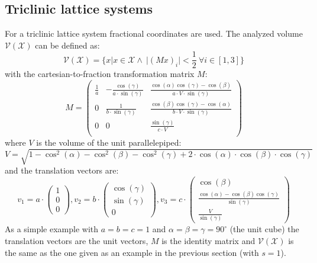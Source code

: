   \subsection{Triclinic lattice systems}
  For a triclinic lattice system fractional coordinates are used. The analyzed volume $\mathcal{V}(\mathcal{X})$ can be defined as:
  \[\mathcal{V}(\mathcal{X}) = \{x | x \in \mathcal{X} \land\ |(Mx)_i| < \frac{1}{2} ~\forall i \in [1,3]\}\]
  with the cartesian-to-fraction transformation matrix $M$:
  \[M = \begin{pmatrix}
  \frac{1}{a}&-\frac{\cos(\gamma)}{a \cdot \sin(\gamma)}&\frac{\cos(\alpha)\cos(\gamma)-\cos(\beta)}{a\cdot V \cdot \sin(\gamma)}\\
  0&\frac{1}{b \cdot \sin(\gamma)}&\frac{\cos(\beta)\cos(\gamma)-\cos(\alpha)}{b\cdot V \cdot \sin(\gamma)}\\
  0&0&\frac{\sin(\gamma)}{c \cdot V}\\
  \end{pmatrix}\]
  where $V$ is the volume of the unit parallelepiped:
  \[V = \sqrt{1-\cos^2(\alpha)-\cos^2(\beta)-\cos^2(\gamma)+2\cdot\cos(\alpha)\cdot\cos(\beta)\cdot\cos(\gamma)}\]
  and the translation vectors are:
  \begingroup
  \renewcommand*{\arraystretch}{1.2}
  \[
  v_1 = a\cdot\begin{pmatrix}1\\0\\0\end{pmatrix},
  v_2 = b\cdot\begin{pmatrix}\cos(\gamma)\\\sin(\gamma)\\0\end{pmatrix},
  v_3 = c\cdot\begin{pmatrix}\cos(\beta)\\\frac{\cos(\alpha)-\cos(\beta)\cos(\gamma)}{\sin(\gamma)}\\\frac{V}{\sin(\gamma)}\end{pmatrix}
  \]
  \endgroup
  As a simple example with $a=b=c=1$ and $\alpha=\beta=\gamma=90^\circ$ (the unit cube) the translation vectors are the unit vectors, $M$ is the identity matrix and $\mathcal{V}(\mathcal{X})$ is the same as the one given as an example in the previous section (with $s=1$).

